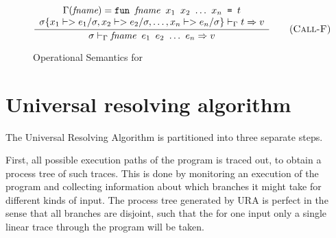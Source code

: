 \documentclass[10pt]{../sigplanconf}
\newcommand{\nfrac}[2]{\frac{\displaystyle{#1}}{\displaystyle{#2}}}
\newcommand{\tagsc}[1]{\tag{\scshape #1}}
\begin{document}
\begin{figure}
\begin{equation}
{  }
  \tagsc{Call-G}
\end{equation}

\begin{equation}
  \nfrac{
    \begin{array}{c}
      \Gamma(\textit{fname}) =
        \texttt{fun \textit{\rmfamily fname} $x_1$ $x_2$ $\ldots$ $x_n$ = $t$}
        \\
      \sigma\{x_1 |-> e_1/\sigma, x_2 |-> e_2/\sigma, \ldots, x_n |-> e_n/\sigma\} |-_\Gamma t => v
    \end{array}
  }{
    \sigma |-_\Gamma \texttt{\textit{\rmfamily fname} $e_1$ $e_2$ $\ldots$ $e_n$} => v
  } \tagsc{Call-F}
\end{equation}


\caption{Operational Semantics for }
\label{fig:semantics}
\end{figure}


\section{Universal resolving algorithm}
The Universal Resolving Algorithm is partitioned into three separate
steps.

First, all possible execution paths of the program is traced out, to
obtain a process tree of such traces. This is done by monitoring an
execution of the program and collecting information about which
branches it might take for different kinds of input. The process tree
generated by URA is perfect in the sense that all branches are
disjoint, such that the for one input only a single linear trace
through the program will be taken.
\end{document}
